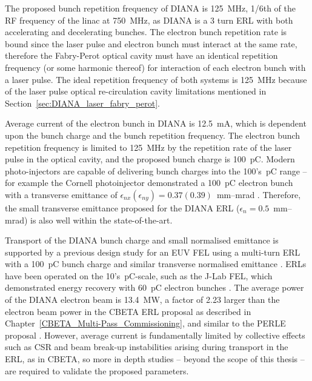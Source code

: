 \documentclass[../main.tex]{subfiles}
\begin{document}
The proposed bunch repetition frequency of DIANA is 125~\si{\mega\hertz}, 1/6th of the RF frequency of the linac at 750~\si{\mega\hertz}, as DIANA is a 3 turn ERL with both accelerating and decelerating bunches. The electron bunch repetition rate is bound since the laser pulse and electron bunch must interact at the same rate, therefore the Fabry-Perot optical cavity must have an identical repetition frequency (or some harmonic thereof) for interaction of each electron bunch with a laser pulse. The ideal repetition frequency of both systems is 125~\si{\mega\hertz} because of the laser pulse optical re-circulation cavity limitations mentioned in Section~\ref{sec:DIANA_laser_fabry_perot}.

Average current of the electron bunch in DIANA is 12.5~\si{\milli\ampere}, which is dependent upon the bunch charge and the bunch repetition frequency. The electron bunch repetition frequency is limited to 125~\si{\mega\hertz} by the repetition rate of the laser pulse in the optical cavity, and the proposed bunch charge is 100~\si{\pico\coulomb}. Modern photo-injectors are capable of delivering bunch charges into the 100's~\si{\pico\coulomb} range \cite{angal2018perle,hounsell2021optimization} -- for example the Cornell photoinjector demonstrated a 100~\si{\pico\coulomb} electron bunch with a transverse emittance of $\epsilon_{nx} \left(\epsilon_{ny}\right) = 0.37 (0.39)$~\si{\milli\meter}--\si{\milli\radian} \cite{bartnik2015operational}. Therefore, the small transverse emittance proposed for the DIANA ERL ($\epsilon_{n}=0.5$~\si{\milli\meter}--\si{\milli\radian}) is also well within the state-of-the-art.

Transport of the DIANA bunch charge and small normalised emittance is supported by a previous design study for an EUV FEL using a multi-turn ERL with a 100~\si{\pico\coulomb} bunch charge and similar transverse normalised emittance \cite{akkermans2017compact}. ERLs have been operated on the 10's~\si{\pico\coulomb}-scale, such as the J-Lab FEL, which demonstrated energy recovery with 60~\si{\pico\coulomb} electron bunches \cite{benson1999first}. The average power of the DIANA electron beam is 13.4~\si{\mega\watt}, a factor of 2.23 larger than the electron beam power in the CBETA ERL proposal as described in Chapter~\ref{CBETA_Multi-Pass_Commissioning}, and similar to the PERLE proposal \cite{angal2018perle}. However, average current is fundamentally limited by collective effects such as CSR and beam break-up instabilities arising during transport in the ERL, as in CBETA, so more in depth studies -- beyond the scope of this thesis -- are required to validate the proposed parameters. 
\end{document}
